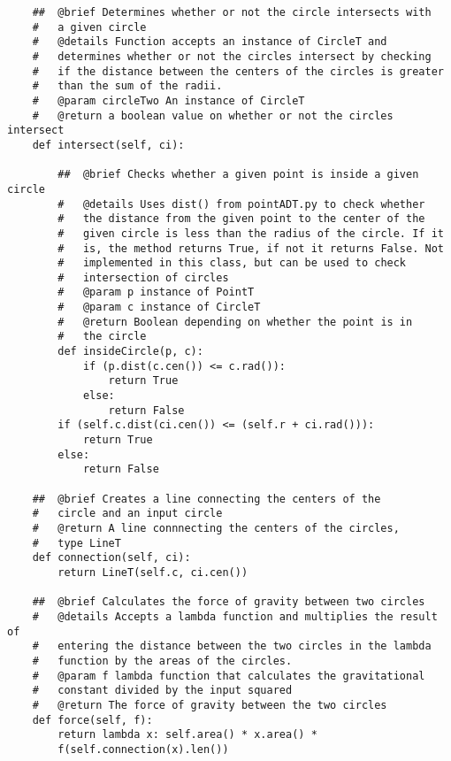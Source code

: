 \documentclass{article}
\begin{document}
\begin{lstlisting}
    ##  @brief Determines whether or not the circle intersects with 
    #   a given circle
    #   @details Function accepts an instance of CircleT and 
    #   determines whether or not the circles intersect by checking 
    #   if the distance between the centers of the circles is greater 
    #   than the sum of the radii.
    #   @param circleTwo An instance of CircleT
    #   @return a boolean value on whether or not the circles intersect
    def intersect(self, ci):
        
        ##  @brief Checks whether a given point is inside a given circle 
        #   @details Uses dist() from pointADT.py to check whether 
        #   the distance from the given point to the center of the 
        #   given circle is less than the radius of the circle. If it 
        #   is, the method returns True, if not it returns False. Not 
        #   implemented in this class, but can be used to check 
        #   intersection of circles
        #   @param p instance of PointT
        #   @param c instance of CircleT
        #   @return Boolean depending on whether the point is in 
        #   the circle
        def insideCircle(p, c):
            if (p.dist(c.cen()) <= c.rad()):
                return True
            else:
                return False
        if (self.c.dist(ci.cen()) <= (self.r + ci.rad())):
            return True
        else:
            return False

    ##  @brief Creates a line connecting the centers of the 
    #   circle and an input circle 
    #   @return A line connnecting the centers of the circles, 
    #   type LineT
    def connection(self, ci):
        return LineT(self.c, ci.cen())

    ##  @brief Calculates the force of gravity between two circles
    #   @details Accepts a lambda function and multiplies the result of 
    #   entering the distance between the two circles in the lambda  
    #   function by the areas of the circles.
    #   @param f lambda function that calculates the gravitational 
    #   constant divided by the input squared
    #   @return The force of gravity between the two circles
    def force(self, f):
        return lambda x: self.area() * x.area() *
        f(self.connection(x).len())
        

\end{lstlisting}
\end{document}
